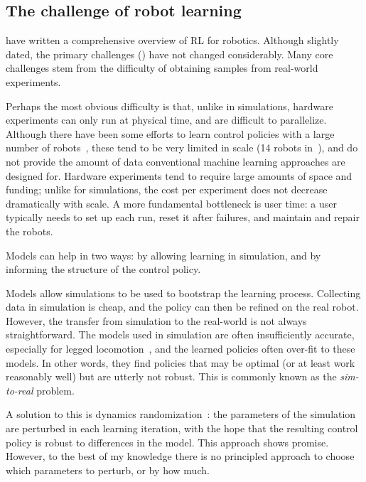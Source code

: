 \subsection{The challenge of robot learning}

\textcite{kober2013reinforcement} have written a comprehensive overview of RL for robotics. Although slightly dated, the primary challenges (\cite[see 8.1 in]{kober2013reinforcement}) have not changed considerably. Many core challenges stem from the difficulty of obtaining samples from real-world experiments. \par
Perhaps the most obvious difficulty is that, unlike in simulations, hardware experiments can only run at physical time, and are difficult to parallelize. Although there have been some efforts to learn control policies with a large number of robots~\cite{levine2018learning}, these tend to be very limited in scale (14 robots in~\cite{levine2018learning}), and do not provide the amount of data conventional machine learning approaches are designed for.
Hardware experiments tend to require large amounts of space and funding; unlike for simulations, the cost per experiment does not decrease dramatically with scale.
A more fundamental bottleneck is user time: a user typically needs to set up each run, reset it after failures, and maintain and repair the robots. \par
Models can help in two ways: by allowing learning in simulation, and by informing the structure of the control policy.
 \par
Models allow simulations to be used to bootstrap the learning process. Collecting data in simulation is cheap, and the policy can then be refined on the real robot. However, the transfer from simulation to the real-world is not always straightforward.
The models used in simulation are often insufficiently accurate, especially for legged locomotion~\cite{neunert2017off,tan2018sim}, and the learned policies often over-fit to these models. In other words, they find policies that may be optimal (or at least work reasonably well) but are utterly not robust. This is commonly known as the \emph{sim-to-real} problem. \par
A solution to this is dynamics randomization~\cite{peng2017sim,lowrey2018reinforcement,tan2018sim}: the parameters of the simulation are perturbed in each learning iteration, with the hope that the resulting control policy is robust to differences in the model. This approach shows promise. However, to the best of my knowledge there is no principled approach to choose which parameters to perturb, or by how much. \par
